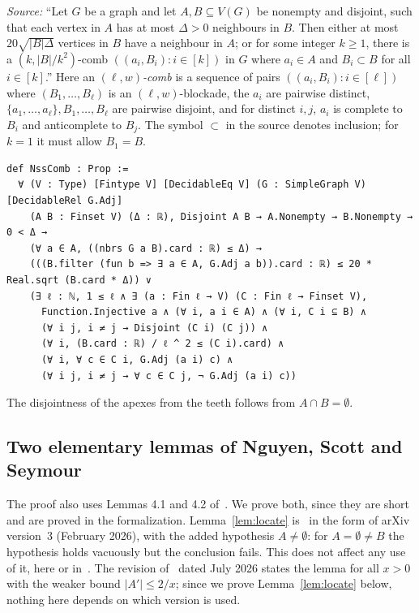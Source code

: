 \begin{importedthm}\label{imp:comb}
\emph{Source:} ``Let $G$ be a graph and let $A,B\subseteq V(G)$ be nonempty and disjoint, such that each
vertex in $A$ has at most $\Delta>0$ neighbours in $B$. Then either at most $20\sqrt{|B|\Delta}$ vertices
in $B$ have a neighbour in $A$; or for some integer $k\ge1$, there is a $(k,|B|/k^2)$-comb
$((a_i,B_i):i\in[k])$ in $G$ where $a_i\in A$ and $B_i\subset B$ for all $i\in[k]$.'' Here an
\emph{$(\ell,w)$-comb} is a sequence of pairs $((a_i,B_i):i\in[\ell])$ where $(B_1,\dots,B_\ell)$ is an
$(\ell,w)$-blockade, the $a_i$ are pairwise distinct, $\{a_1,\dots,a_\ell\},B_1,\dots,B_\ell$ are pairwise
disjoint, and for distinct $i,j$, $a_i$ is complete to $B_i$ and anticomplete to $B_j$. The symbol
$\subset$ in the source denotes inclusion; for $k=1$ it must allow $B_1=B$.
\begin{lstlisting}
def NssComb : Prop :=
  ∀ (V : Type) [Fintype V] [DecidableEq V] (G : SimpleGraph V) [DecidableRel G.Adj]
    (A B : Finset V) (Δ : ℝ), Disjoint A B → A.Nonempty → B.Nonempty → 0 < Δ →
    (∀ a ∈ A, ((nbrs G a B).card : ℝ) ≤ Δ) →
    (((B.filter (fun b => ∃ a ∈ A, G.Adj a b)).card : ℝ) ≤ 20 * Real.sqrt (B.card * Δ)) ∨
    (∃ ℓ : ℕ, 1 ≤ ℓ ∧ ∃ (a : Fin ℓ → V) (C : Fin ℓ → Finset V),
      Function.Injective a ∧ (∀ i, a i ∈ A) ∧ (∀ i, C i ⊆ B) ∧
      (∀ i j, i ≠ j → Disjoint (C i) (C j)) ∧
      (∀ i, (B.card : ℝ) / ℓ ^ 2 ≤ (C i).card) ∧
      (∀ i, ∀ c ∈ C i, G.Adj (a i) c) ∧
      (∀ i j, i ≠ j → ∀ c ∈ C j, ¬ G.Adj (a i) c))
\end{lstlisting}
The disjointness of the apexes from the teeth follows from $A\cap B=\emptyset$.
\end{importedthm}

\subsection{Two elementary lemmas of Nguyen, Scott and Seymour}
The proof also uses Lemmas 4.1 and 4.2 of~\cite{NSS7}. We prove both, since they are short and are
proved in the formalization. Lemma~\ref{lem:locate} is~\cite[Lemma 4.2]{NSS7} in the form of arXiv version~3
(February 2026), with the added hypothesis $A\ne\emptyset$: for $A=\emptyset\ne B$ the hypothesis holds
vacuously but the conclusion fails. This does not affect any use of it, here or in~\cite{NSS7}. The
revision of~\cite{NSS7} dated July 2026 states the lemma for all $x>0$ with the weaker bound
$|A'|\le2/x$; since we prove Lemma~\ref{lem:locate} below, nothing here depends on which version is used.

